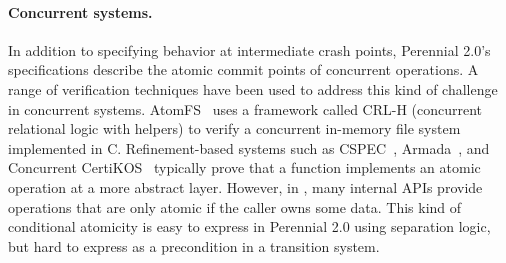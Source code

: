 
\paragraph{Concurrent systems.}

In addition to specifying behavior at intermediate crash points, Perennial 2.0's
specifications describe the atomic commit points of concurrent operations. A
range of verification techniques have been used to address this kind of
challenge in concurrent systems. AtomFS~\cite{zou:atomfs} uses a framework
called CRL-H (concurrent relational logic with helpers) to verify a concurrent
in-memory file system implemented in C. Refinement-based systems such as
CSPEC~\cite{chajed:cspec}, Armada~\cite{lorch:armada}, and Concurrent
CertiKOS~\cite{gu:certikos-ccal} typically prove that a function implements an
atomic operation at a more abstract layer.
However, in \txn, many internal APIs provide operations that are only atomic if
the caller owns some data. This kind of conditional atomicity is easy to express
in Perennial 2.0 using separation logic, but hard to express
as a precondition in a transition system.


